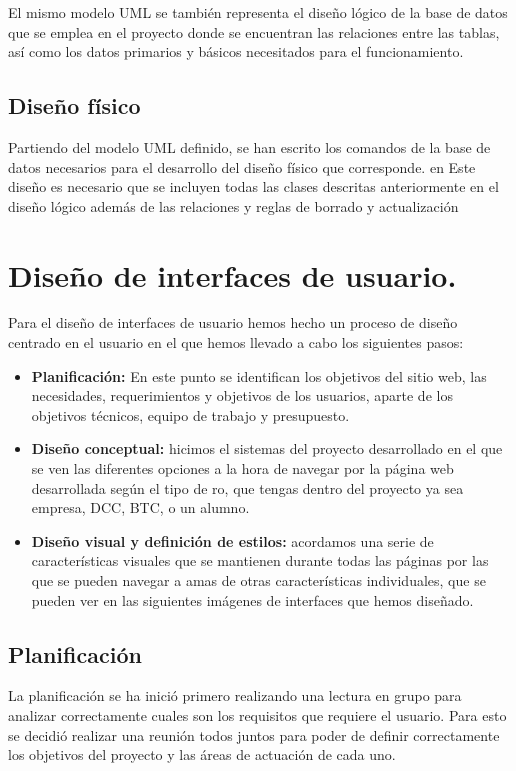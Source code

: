 \documentclass[pdftex,11pt,a4paper]{book}
\begin{document}
El mismo modelo UML se también representa el diseño lógico de la base de datos que se emplea en el proyecto donde se encuentran las relaciones entre las tablas, así como los datos primarios y básicos necesitados para el funcionamiento.

\section{Diseño físico}

Partiendo del modelo UML definido, se han escrito los comandos de la base de datos necesarios para el desarrollo del diseño físico que corresponde. en Este diseño es necesario que se incluyen todas las clases descritas anteriormente en el diseño lógico además de las relaciones y reglas de borrado y actualización



\chapter{Diseño de interfaces de usuario.}

Para el diseño de interfaces de usuario hemos hecho un proceso de diseño centrado en el usuario en el que hemos llevado a cabo los siguientes pasos:
\begin{itemize}
\item \textbf{Planificación:} En este punto se identifican los objetivos del sitio web, las necesidades, requerimientos y objetivos de los usuarios, aparte de los objetivos técnicos, equipo de trabajo y presupuesto.

\item \textbf{Diseño conceptual:} hicimos el sistemas del proyecto desarrollado en el que se ven las diferentes opciones a la hora de navegar por la página web desarrollada según el tipo de ro, que tengas dentro del proyecto ya sea empresa, DCC, BTC, o un alumno.

\item \textbf{Diseño visual y definición de estilos:} acordamos una serie de características visuales que se mantienen durante todas las páginas por las que se pueden navegar a amas de otras características individuales, que se pueden ver en las siguientes imágenes de interfaces que hemos diseñado.

\end{itemize}

\section{Planificación}
La planificación se ha inició primero realizando una lectura en grupo para analizar correctamente cuales son los requisitos que requiere el usuario. Para esto se decidió realizar una reunión todos juntos para poder de definir correctamente los objetivos del proyecto y las áreas de actuación de cada uno.
\end{document}
